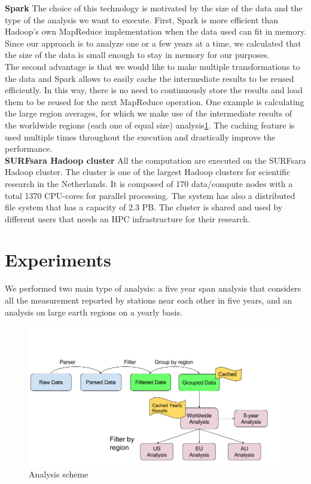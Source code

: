 \documentclass{vldb}
\begin{document}
\textbf{Spark}
The choice of this technology is motivated by the size of the data and the type of the analysis we want to execute. First, Spark is more efficient than Hadoop's own MapReduce\cite{dean2008mapreduce} implementation when the data used can fit in memory. Since our approach is to analyze one or a few years at a time, we calculated that the size of the data is small enough to stay in memory for our purposes. \\
The second advantage is that we would like to make multiple transformations to the data and Spark allows to easily cache the intermediate results to be reused efficiently. In this way, there is no need to continuously store the results and load them to be reused for the next MapReduce operation. One example is calculating the large region averages, for which we make use of the intermediate results of the worldwide regions (each one of equal size) analysis\ref{fig:analysis}. The caching feature is used multiple times throughout the execution and drastically improve the performance. \\

\textbf{SURFsara Hadoop cluster}
All the computation are executed on the SURFsara Hadoop cluster\cite{surfsara}. The cluster is one of the largest Hadoop clusters for scientific research in the Netherlands. It is composed of 170 data/compute nodes with a total 1370 CPU-cores for parallel processing. The system has also a distributed file system that has a capacity of 2.3 PB. The cluster is shared and used by different users that needs an HPC infrastructure for their research.

\FloatBarrier

\section{Experiments}
\label{sec:exp}
We performed two main type of analysis: a five year span analysis that considers all the measurement reported by stations near each other in five years, and an analysis on large earth regions on a yearly basis. \\

\begin{figure}[tbh]
\includegraphics[width=1\linewidth]{analysis}
\caption{Analysis scheme}
\label{fig:analysis}
\end{figure}
\end{document}
